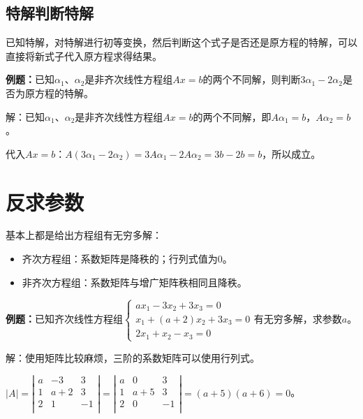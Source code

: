\subsection{特解判断特解}

已知特解，对特解进行初等变换，然后判断这个式子是否还是原方程的特解，可以直接将新式子代入原方程求得结果。

\textbf{例题：}已知$\alpha_1$、$\alpha_2$是非齐次线性方程组$Ax=b$的两个不同解，则判断$3\alpha_1-2\alpha_2$是否为原方程的特解。

解：已知$\alpha_1$、$\alpha_2$是非齐次线性方程组$Ax=b$的两个不同解，即$A\alpha_1=b$，$A\alpha_2=b$。

代入$Ax=b$：$A(3\alpha_1-2\alpha_2)=3A\alpha_1-2A\alpha_2=3b-2b=b$，所以成立。


\section{反求参数}

基本上都是给出方程组有无穷多解：

\begin{itemize}
    \item 齐次方程组：系数矩阵是降秩的；行列式值为0。
    \item 非齐次方程组：系数矩阵与增广矩阵秩相同且降秩。
\end{itemize}

\textbf{例题：}已知齐次线性方程组$\left\{\begin{array}{l}
    ax_1-3x_2+3x_3=0 \\
    x_1+(a+2)x_2+3x_3=0 \\
    2x_1+x_2-x_3=0
\end{array}\right.$有无穷多解，求参数$a$。

解：使用矩阵比较麻烦，三阶的系数矩阵可以使用行列式。

$\vert A\vert=\left\vert\begin{array}{ccc}
    a & -3 & 3 \\
    1 & a+2 & 3 \\
    2 & 1 & -1 \\
\end{array}\right\vert=\left\vert\begin{array}{ccc}
    a & 0 & 3 \\
    1 & a+5 & 3 \\
    2 & 0 & -1 \\
\end{array}\right\vert=(a+5)(a+6)=0$。

